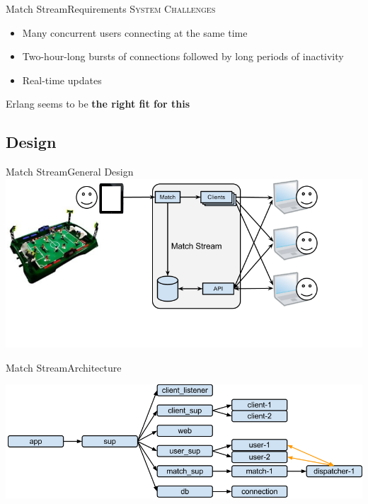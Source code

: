 \documentclass[utf8]{beamer}
\begin{document}
\begin{frame}{Match Stream}{Requirements}
	\textsc{System Challenges}
	\begin{itemize}
		\item<+-> Many concurrent users connecting at the same time
		\item<+-> Two-hour-long bursts of connections followed by long periods of inactivity
		\item<+-> Real-time updates
	\end{itemize}
	\onslide<+->Erlang seems to be \textbf{the right fit for this}
\end{frame}

\subsection{Design}
\begin{frame}{Match Stream}{General Design}
	\includegraphics[width=\textwidth]{img/MatchStream.png}
\end{frame}
\begin{frame}[t]{Match Stream}{Architecture}
	\begin{center}
		\includegraphics[width=\textwidth]{img/architecture-1.png}
	\end{center}
\end{frame}
\end{document}
